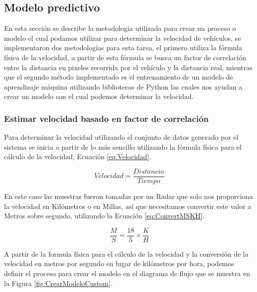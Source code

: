 \subsection{Modelo predictivo}
\label{cap:EstimacionVelocidad}

En esta sección se describe la metodología utilizada para crear un proceso o modelo el cual podamos utilizar para determinar la velocidad de vehículos, se implementaron dos metodologías para esta tarea, el primero utiliza la fórmula física de la velocidad, a partir de esta fórmula se busca un factor de correlación entre la distancia en pixeles recorrida por el vehículo y la distancia real, mientras que el segundo método implementado es el entrenamiento de un modelo de aprendizaje máquina utilizando bibliotecas de Python las cuales nos ayudan a crear un modelo con el cual podemos determinar la velocidad.

\subsubsection{Estimar velocidad basado en factor de correlación}

Para determinar la velocidad utilizando el conjunto de datos generado por el sistema se inicia a partir de lo más sencillo utilizando la fórmula física para el cálculo de la velocidad, Ecuación \ref{eq:Velocidad}.

\begin{equation}
    \label{eq:Velocidad}
    Velocidad = \frac{Distancia}{Tiempo}
\end{equation}

En este caso las muestras fueron tomadas por un Radar que solo nos proporciona la velocidad en Kilómetros o en Millas, así que necesitamos convertir este valor a Metros sobre segundo, utilizando la Ecuación \ref{eq:ConvertMSKH}.

\begin{equation}
    \label{eq:ConvertMSKH}
    \frac{M}{S} = \frac{18}{5} \times \frac{K}{H}
\end{equation}

A partir de la formula física para el cálculo de la velocidad y la conversión de la velocidad en metros por segundo en lugar de kilómetros por hora, podemos definir el proceso para crear el modelo en el diagrama de flujo que se muestra en la Figura \ref{fig:CrearModeloCustom}.


